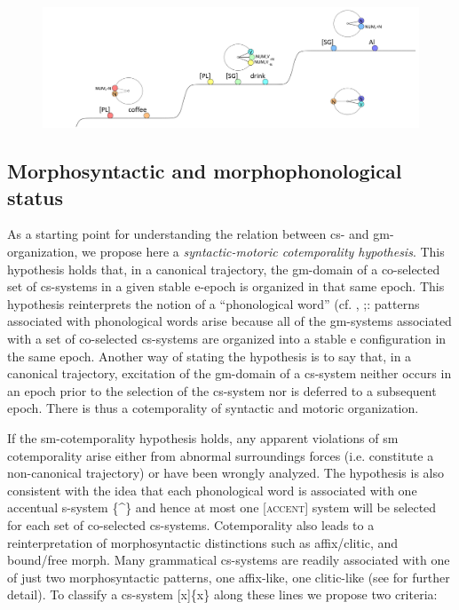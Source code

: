 \begin{enumerate}
  
\begin{figure}
\includegraphics[width=\textwidth]{figures/Tilsen-img67.png}
\caption{\missingcaption}
\label{fig:4:17}
\end{figure}
\end{enumerate}
 

\subsection{Morphosyntactic and morphophonological status}

As a starting point for understanding the relation between cs- and gm-organization, we propose here a \textit{syntactic-motoric cotemporality hypothesis}. This hypothesis holds that, in a canonical trajectory, the gm-domain of a co-selected set of cs-systems in a given stable e-epoch is organized in that same epoch. This hypothesis reinterprets the notion of a “phonological word” (cf. \citealt{NesporVogel1986}, \citealt{Selkirk1984,Selkirk2011};: patterns associated with phonological words arise because all of the gm-systems associated with a set of co-selected cs-systems are organized into a stable e configuration in the same epoch. Another way of stating the hypothesis is to say that, in a canonical trajectory, excitation of the gm-domain of a cs-system neither occurs in an epoch prior to the selection of the cs-system nor is deferred to a subsequent epoch. There is thus a cotemporality of syntactic and motoric organization. 

  If the sm-cotemporality hypothesis holds, any apparent violations of sm cotemporality arise either from abnormal surroundings forces (i.e. constitute a non-canonical trajectory) or have been wrongly analyzed. The hypothesis is also consistent with the idea that each phonological word is associated with one accentual s-system \{\^{}\} and hence at most one [\textsc{accent}] system will be selected for each set of co-selected cs-systems. Cotemporality also leads to a reinterpretation of morphosyntactic distinctions such as affix/clitic, and bound/free morph. Many grammatical cs-systems are readily associated with one of just two morphosyntactic patterns, one affix-like, one clitic-like (see \citealt{Payne1997,Zwicky1985,ZwickyPullum1983} for further detail). To classify a cs-system [x]\{x\} along these lines we propose two criteria:

